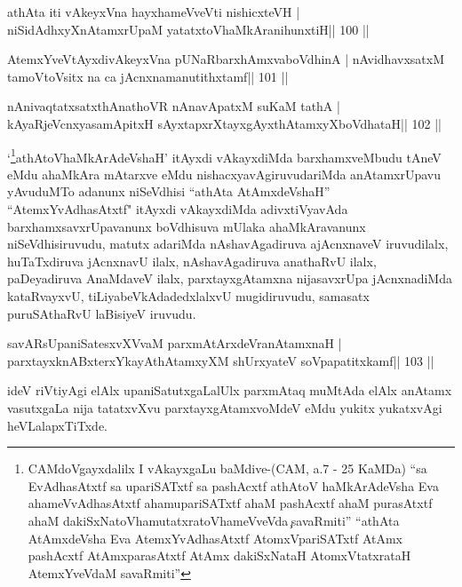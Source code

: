 
\begin{shl}
athAta iti vAkeyxVna hayxhameVveVti nishicxteVH |
niSidAdhxyXnAtamxrUpaM yatatxtoV\s haMkAranihunxtiH\hfill || 100 ||
\end{shl}

\begin{shl}
AtemxYveVtAyxdivAkeyxVna pUNaRbarxhAmxvaboVdhinA |
nAvidhavxsatxM tamoV\s toV\s sitx na ca jAcnxnamanutithxtamf\hfill || 101 ||
\end{shl}

\begin{shl}
nAnivaqtatxsatxthA\s nathoVR nAnavApatxM suKaM tathA |
kAyaRjeVcnxyasamApitxH sAyxtapxrXtayxgAyxthAtamxyXboVdhataH\hfill || 102 ||
\end{shl}

\begin{artha}
`\footnote[1]{CAMdoVgayxdalilx I vAkayxgaLu baMdive-(CAM, a.7 - 25
    KaMDa) ``sa EvAdhasAtxtf sa upariSATxtf sa pashAcxtf athAtoV\s
    haMkArAdeVsha Eva ahameVvAdhasAtxtf ahamupariSATxtf ahaM pashAcxtf
  ahaM purasAtxtf ahaM dakiSxNatoV\s hamutatxratoV\s hameVveVda\c\ savaRmiti'' ``athAta AtAmxdeVsha Eva AtemxYvAdhasAtxtf
  AtomxVpariSATxtf AtAmx pashAcxtf AtAmxparasAtxtf AtAmx dakiSxNataH
  AtomxVtatxrataH AtemxYveVdaM savaRmiti''}athAtoV\s haMkArAdeVshaH' 
  itAyxdi vAkayxdiMda barxhamxveMbudu tAneV eMdu ahaMkAra mAtarxve eMdu
  nishacxyavAgiruvudariMda anAtamxrUpavu yAvuduMTo adanunx niSeVdhisi
  ``athAta AtAmxdeVshaH'' ``AtemxYvAdhasAtxtf" itAyxdi vAkayxdiMda
  adivxtiVyavAda barxhamxsavxrUpavanunx boVdhisuva mUlaka
  ahaMkAravanunx niSeVdhisiruvudu, matutx adariMda nAshavAgadiruva
  ajAcnxnaveV iruvudilalx, huTaTxdiruva jAcnxnavU ilalx,
  nAshavAgadiruva anathaRvU ilalx, paDeyadiruva AnaMdaveV ilalx,
  parxtayxgAtamxna nijasavxrUpa jAcnxnadiMda kataRvayxvU,
  tiLiyabeVkAdadedxlalxvU mugidiruvudu, samasatx puruSAthaRvU laBisiyeV
  iruvudu.
\end{artha}

\begin{shl}
savARsUpaniSatesxvXVvaM parxmAtArxdeVranAtamxnaH |
parxtayxknABxterxYkayAthAtamxyXM shUrxyateV soVpapatitxkamf\hfill || 103 ||
\end{shl}

\begin{artha}
ideV riVtiyAgi elAlx upaniSatutxgaLalUlx parxmAtaq muMtAda elAlx anAtamx
vasutxgaLa nija tatatxvXvu parxtayxgAtamxvoMdeV eMdu yukitx yukatxvAgi heVLalapxTiTxde.
\end{artha}

